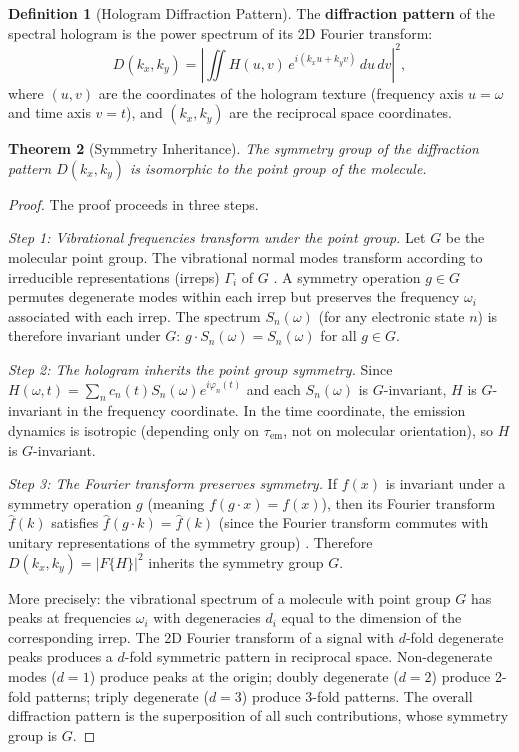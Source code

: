 \documentclass[11pt,twocolumn,a4paper]{article}
\newtheorem{theorem}{Theorem}[section]
\theoremstyle{definition}
\newtheorem{definition}[theorem]{Definition}
\theoremstyle{remark}
\begin{document}
\begin{definition}[Hologram Diffraction Pattern]
\label{def:diffraction}
The \textbf{diffraction pattern} of the spectral hologram is the power spectrum of its 2D Fourier transform:
\begin{equation}
\label{eq:diffraction}
D(k_x, k_y) = \left| \iint H(u, v) \, e^{i(k_x u + k_y v)} \, du \, dv \right|^2,
\end{equation}
where $(u, v)$ are the coordinates of the hologram texture (frequency axis $u = \omega$ and time axis $v = t$), and $(k_x, k_y)$ are the reciprocal space coordinates.
\end{definition}

\begin{theorem}[Symmetry Inheritance]
\label{thm:symmetry}
The symmetry group of the diffraction pattern $D(k_x, k_y)$ is isomorphic to the point group of the molecule.
\end{theorem}

\begin{proof}
The proof proceeds in three steps.

\emph{Step 1: Vibrational frequencies transform under the point group.} Let $G$ be the molecular point group. The vibrational normal modes transform according to irreducible representations (irreps) $\Gamma_i$ of $G$ \citep{cotton1990, wilson1955}. A symmetry operation $g \in G$ permutes degenerate modes within each irrep but preserves the frequency $\omega_i$ associated with each irrep. The spectrum $S_n(\omega)$ (for any electronic state $n$) is therefore invariant under $G$: $g \cdot S_n(\omega) = S_n(\omega)$ for all $g \in G$.

\emph{Step 2: The hologram inherits the point group symmetry.} Since $H(\omega, t) = \sum_n c_n(t) S_n(\omega) e^{i\varphi_n(t)}$ and each $S_n(\omega)$ is $G$-invariant, $H$ is $G$-invariant in the frequency coordinate. In the time coordinate, the emission dynamics is isotropic (depending only on $\tau_{\mathrm{em}}$, not on molecular orientation), so $H$ is $G$-invariant.

\emph{Step 3: The Fourier transform preserves symmetry.} If $f(x)$ is invariant under a symmetry operation $g$ (meaning $f(g \cdot x) = f(x)$), then its Fourier transform $\hat{f}(k)$ satisfies $\hat{f}(g \cdot k) = \hat{f}(k)$ (since the Fourier transform commutes with unitary representations of the symmetry group) \citep{bornwolf1999}. Therefore $D(k_x, k_y) = |F\{H\}|^2$ inherits the symmetry group $G$.

More precisely: the vibrational spectrum of a molecule with point group $G$ has peaks at frequencies $\omega_i$ with degeneracies $d_i$ equal to the dimension of the corresponding irrep. The 2D Fourier transform of a signal with $d$-fold degenerate peaks produces a $d$-fold symmetric pattern in reciprocal space. Non-degenerate modes ($d=1$) produce peaks at the origin; doubly degenerate ($d=2$) produce 2-fold patterns; triply degenerate ($d=3$) produce 3-fold patterns. The overall diffraction pattern is the superposition of all such contributions, whose symmetry group is $G$.
\end{proof}
\end{document}
